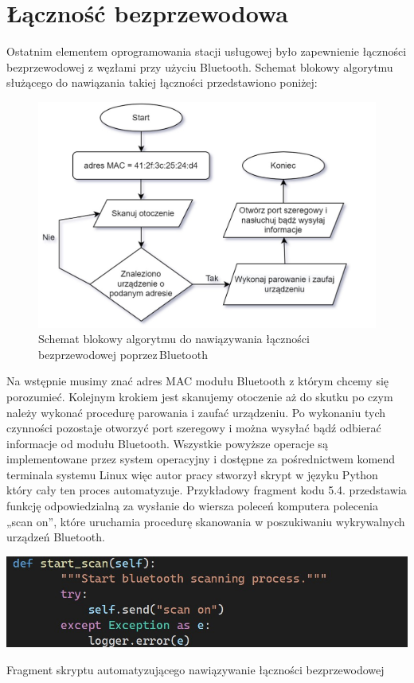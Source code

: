 \documentclass[12pt, twoside, openany]{mwrep}
\begin{document}
\section{Łączność bezprzewodowa}
Ostatnim elementem oprogramowania stacji usługowej było zapewnienie łączności bezprzewodowej z węzłami przy użyciu Bluetooth. Schemat blokowy algorytmu służącego do nawiązania takiej łączności przedstawiono poniżej:
\begin{figure}[H]
\centering
\includegraphics[scale=0.5]{algorytm}
\caption{Schemat blokowy algorytmu do nawiązywania łączności bezprzewodowej poprzez\,Bluetooth}
\end{figure}
\par
Na wstępnie musimy znać adres MAC modułu Bluetooth z którym chcemy się porozumieć. Kolejnym krokiem jest skanujemy otoczenie aż do skutku po czym należy wykonać procedurę parowania i zaufać urządzeniu. Po wykonaniu tych czynności pozostaje otworzyć port szeregowy i można wysyłać bądź odbierać informacje od modułu Bluetooth. Wszystkie powyższe operacje są implementowane przez system operacyjny i dostępne za pośrednictwem komend terminala systemu Linux więc autor pracy stworzył skrypt w języku Python który cały ten proces automatyzuje. Przykładowy fragment kodu 5.4. przedstawia funkcję odpowiedzialną za wysłanie do wiersza poleceń komputera polecenia „scan on”, które uruchamia procedurę skanowania w poszukiwaniu wykrywalnych urządzeń Bluetooth.

\begin{algorithm}[H]
\centering
\includegraphics[scale=0.7]{kod_bt}
\caption{Fragment skryptu automatyzującego nawiązywanie łączności bezprzewodowej}
\end{algorithm}
\end{document}
